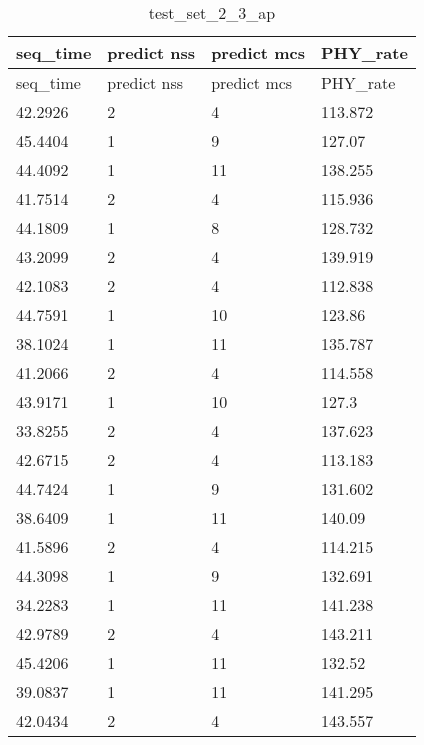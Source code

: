 \documentclass[bwprint]{gmcmthesis}
\begin{document}
\begin{longtable}[c]{llll}
\caption{test\_set\_2\_3\_ap} \label{tab:long} \\

\hline
seq\_time & predict nss & predict mcs & PHY\_rate \\
\hline
\endfirsthead

\hline
seq\_time & predict nss & predict mcs & PHY\_rate \\
\hline
\endhead

\hline
\endfoot

42.2926   & 2           & 4           & 113.872   \\
45.4404   & 1           & 9           & 127.07    \\
44.4092   & 1           & 11          & 138.255   \\
41.7514   & 2           & 4           & 115.936   \\
44.1809   & 1           & 8           & 128.732   \\
43.2099   & 2           & 4           & 139.919   \\
42.1083   & 2           & 4           & 112.838   \\
44.7591   & 1           & 10          & 123.86    \\
38.1024   & 1           & 11          & 135.787   \\
41.2066   & 2           & 4           & 114.558   \\
43.9171   & 1           & 10          & 127.3     \\
33.8255   & 2           & 4           & 137.623   \\
42.6715   & 2           & 4           & 113.183   \\
44.7424   & 1           & 9           & 131.602   \\
38.6409   & 1           & 11          & 140.09    \\
41.5896   & 2           & 4           & 114.215   \\
44.3098   & 1           & 9           & 132.691   \\
34.2283   & 1           & 11          & 141.238   \\
42.9789   & 2           & 4           & 143.211   \\
45.4206   & 1           & 11          & 132.52    \\
39.0837   & 1           & 11          & 141.295   \\
42.0434   & 2           & 4           & 143.557   \\

\end{longtable}
\end{document}
